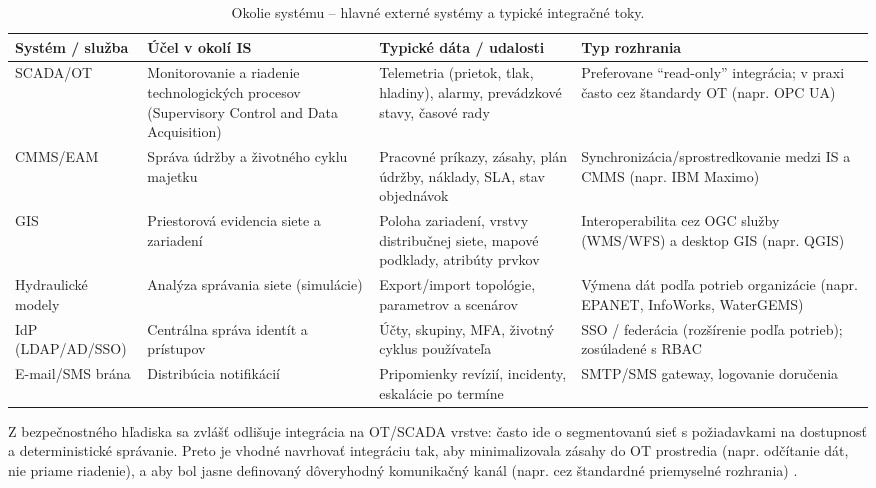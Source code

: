 \begin{table}[!htbp]
\centering
\footnotesize
\renewcommand{\arraystretch}{1.2}
\setlength{\tabcolsep}{3pt}
\begin{tabularx}{\textwidth}{p{20mm} X X p{29mm}}
\toprule
\textbf{Systém / služba} & \textbf{Účel v okolí IS} & \textbf{Typické dáta / udalosti} & \textbf{Typ rozhrania} \\
\midrule
SCADA/OT & Monitorovanie a riadenie technologických procesov (Supervisory Control and Data Acquisition) & Telemetria (prietok, tlak, hladiny), alarmy, prevádzkové stavy, časové rady & Preferovane ``read-only'' integrácia; v praxi často cez štandardy OT (napr. OPC UA) \cite{SiemensWinCCOA,OPCUAOverview2025,NIST80082R3} \\
\midrule
CMMS/EAM & Správa údržby a životného cyklu majetku & Pracovné príkazy, zásahy, plán údržby, náklady, SLA, stav objednávok & Synchronizácia/sprostredkovanie medzi IS a CMMS (napr. IBM Maximo) \cite{IBMMaximo,ISO55000} \\
\midrule
GIS & Priestorová evidencia siete a zariadení & Poloha zariadení, vrstvy distribučnej siete, mapové podklady, atribúty prvkov & Interoperabilita cez OGC služby (WMS/WFS) a desktop GIS (napr. QGIS) \cite{OGCWMS2006,OGCWFS,QGISDocs} \\
\midrule
Hydraulické modely & Analýza správania siete (simulácie) & Export/import topológie, parametrov a scenárov & Výmena dát podľa potrieb organizácie (napr. EPANET, InfoWorks, WaterGEMS) \cite{EPANET,InfoWorksWSPro,OpenFlowsWaterGEMS} \\
\midrule
IdP (LDAP/AD/SSO) & Centrálna správa identít a prístupov & Účty, skupiny, MFA, životný cyklus používateľa & SSO / federácia (rozšírenie podľa potrieb); zosúladené s RBAC \cite{NISTRBACProject} \\
\midrule
E-mail/SMS brána & Distribúcia notifikácií & Pripomienky revízií, incidenty, eskalácie po termíne & SMTP/SMS gateway, logovanie doručenia \cite{NIST80082R3} \\
\bottomrule
\end{tabularx}
\caption{Okolie systému -- hlavné externé systémy a typické integračné toky.}
\label{tab:external-systems}
\end{table}

Z bezpečnostného hľadiska sa zvlášť odlišuje integrácia na OT/SCADA vrstve: často ide o segmentovanú sieť s požiadavkami na dostupnosť a deterministické správanie. Preto je vhodné navrhovať integráciu tak, aby minimalizovala zásahy do OT prostredia (napr. odčítanie dát, nie priame riadenie), a aby bol jasne definovaný dôveryhodný komunikačný kanál (napr. cez štandardné priemyselné rozhrania) \cite{NIST80082R3,ISAIEC62443}.

